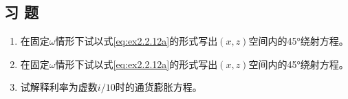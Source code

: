 \subsection{习 题}
\label{sec:2.2.9}

\begin{enumerate}

\item 在固定$\omega$情形下试以式\ref{eq:ex2.2.12a}的形式写出$(x,z)$空间内的45°绕射方程。

\item 在固定$\omega$情形下试以式\ref{eq:ex2.2.12a}的形式写出$(x,z)$空间内的45°绕射方程。

\item 试解释利率为虚数$i/10$时的通货膨胀方程。
\end{enumerate}
